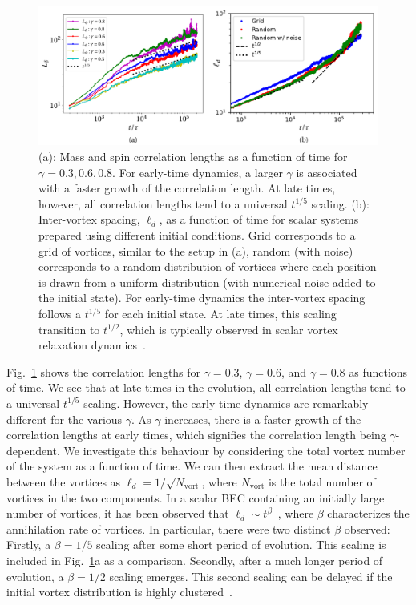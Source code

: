 \begin{figure}
    \centering
    \includegraphics[width=\textwidth]{
        gfx/ch-twoCompDynamics/two-component-correlation-lengths.pdf}
    \caption[Mass and spin correlation lengths associated with half-quantum
    vortex relaxation dynamics, in addition to inter-vortex spacing in a scalar
    system]{\label{fig: correlation-lengths} (a): Mass and spin correlation
    lengths as a function of time for \(\gamma=0.3,0.6, 0.8\).
    For early-time dynamics, a larger \(\gamma \) is associated with a faster
    growth of the correlation length.
    At late times, however, all correlation lengths tend to a universal
    \(t^{1/5}\) scaling.
    (b): Inter-vortex spacing, \(\ell_d\), as a function of time for scalar
    systems prepared using different initial conditions.
    Grid corresponds to a grid of vortices, similar to the setup in (a), random
    (with noise) corresponds to a random distribution of vortices where each
    position is drawn from a uniform distribution (with numerical noise added
    to the initial state).
    For early-time dynamics the inter-vortex spacing follows a
    \(t^{1/5}\) for each initial state.
    At late times, this scaling transition to \(t^{1/2}\), which is typically
    observed in scalar vortex relaxation dynamics~\cite{Nowak2012}.
    }
\end{figure}
Fig.~\ref{fig: correlation-lengths} shows the correlation lengths for
\(\gamma=0.3\), \(\gamma=0.6\), and \(\gamma=0.8\) as functions of time.
We see that at late times in the evolution, all correlation lengths tend to a
universal \(t^{1/5}\) scaling.
However, the early-time dynamics are remarkably different for the various
\(\gamma \).
As \(\gamma \) increases, there is a faster growth of the correlation lengths at
early times, which signifies the correlation length being \(\gamma \)-dependent.
We investigate this behaviour by considering the total vortex number of
the system as a function of time.
We can then extract the mean distance between the vortices as
\(\ell_d=1/\sqrt{N_\mathrm{vort}}\), where \(N_\mathrm{vort}\) is the total
number of vortices in the two components.
In a scalar BEC containing an initially large number of vortices, it has been
observed that \(\ell_d \sim t^\beta \)~\cite{Karl2017}, where \(\beta \)
characterizes the annihilation rate of vortices.
In particular, there were two distinct \(\beta \) observed: Firstly, a
\(\beta=1/5\) scaling after some short period of evolution.
This scaling is included in Fig.~\ref{fig: correlation-lengths}a as a
comparison.
Secondly, after a much longer period of evolution, a \(\beta=1/2\) scaling
emerges.
This second scaling can be delayed if the initial vortex distribution is
highly clustered~\cite{Karl2017}.

